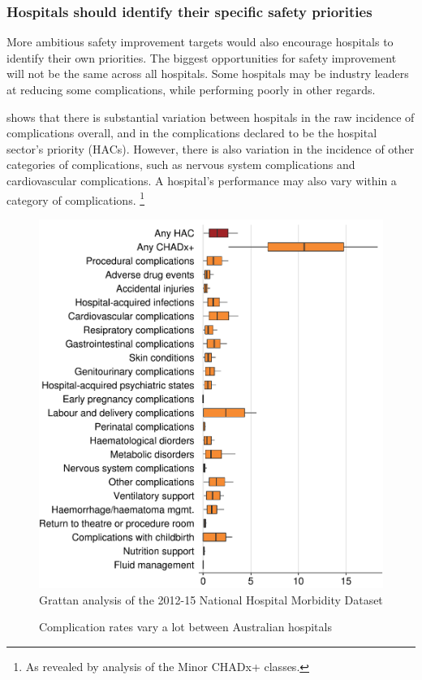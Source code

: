 \documentclass[FrontPage]{grattan}
\begin{document}
\subsubsection{Hospitals should identify their specific safety priorities}\label{subsubsec:hospitals-should-identify-their-specific-safety-priorities}

More ambitious safety improvement targets would also encourage hospitals to identify their own priorities.
The biggest opportunities for safety improvement will not be the same across all hospitals.
Some hospitals may be industry leaders at reducing some complications, while performing poorly in other regards.

 shows that there is substantial variation between hospitals in the raw incidence of complications overall, and in the complications declared to be the hospital sector's priority (HACs).
However, there is also variation in the incidence of other categories of complications, such as nervous system complications and cardiovascular complications.
A hospital's performance may also vary within a category of complications.%
	\footnote{As revealed by analysis of the Minor CHADx+ classes.}

\begin{figure}
\caption{Complication rates vary a lot between Australian hospitals}\label{fig:there-is-scope-to-improve-almost-all-complications}
\includegraphics{atlas/boxplot.pdf}
%
{Grattan analysis of the 2012-15 National Hospital Morbidity Dataset}
\end{figure}
\end{document}
